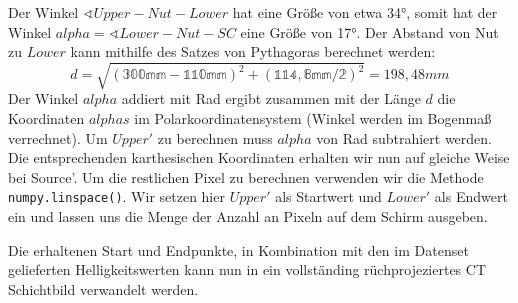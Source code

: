\documentclass[]{dsadokumentation}
\begin{document}
Der Winkel $\sphericalangle Upper-Nut-Lower$ hat eine Größe von etwa 34°, somit hat der Winkel $alpha = \sphericalangle Lower-Nut-SC$ eine Größe von 17°. Der Abstand von Nut zu $Lower$ kann mithilfe des Satzes von Pythagoras berechnet werden:
\[ d = \sqrt{\mathbb{(300mm - 110mm)}^2+\mathbb{(114,8mm/2)}^2} = 198,48mm \]
Der Winkel $alpha$ addiert mit Rad ergibt zusammen mit der Länge $d$ die Koordinaten $alphas$ im Polarkoordinatensystem (Winkel werden im Bogenmaß verrechnet). Um $Upper'$ zu berechnen muss $alpha$ von Rad subtrahiert werden. Die entsprechenden karthesischen Koordinaten erhalten wir nun auf gleiche Weise bei Source'. Um die restlichen Pixel zu berechnen verwenden wir die Methode \verb+numpy.linspace()+. Wir setzen hier $Upper'$ als Startwert und $Lower'$ als Endwert ein und lassen uns die Menge der Anzahl an Pixeln auf dem Schirm ausgeben. 

Die erhaltenen Start und Endpunkte, in Kombination mit den im Datenset gelieferten Helligkeitswerten kann nun in ein vollständing rüchprojeziertes CT Schichtbild verwandelt werden.

\printbibliography{}
\end{document}
